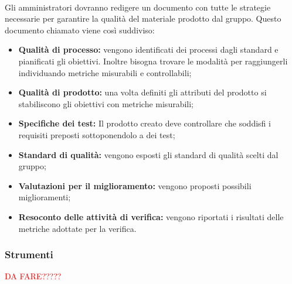 \paragraph{\PdQ} Gli amministratori dovranno redigere un documento con tutte le strategie necessarie per garantire la qualità del materiale prodotto dal gruppo. Questo documento chiamato \PdQv{} viene così suddiviso:
\begin{itemize}
    \item \textbf{Qualità di processo:} vengono identificati dei processi dagli standard e pianificati gli obiettivi. Inoltre bisogna trovare le modalità per raggiungerli individuando metriche misurabili e controllabili;
    
    \item \textbf{Qualità di prodotto:} una volta definiti gli attributi del prodotto si stabiliscono gli obiettivi con metriche misurabili;
    
    \item \textbf{Specifiche dei test:} Il prodotto creato deve controllare che soddisfi i requisiti preposti sottoponendolo a dei test;
    
    \item \textbf{Standard di qualità:} vengono esposti gli standard di qualità scelti dal gruppo;
    
    \item \textbf{Valutazioni per il miglioramento:} vengono proposti possibili miglioramenti;
    
    \item \textbf{Resoconto delle attività di verifica:} vengono riportati i risultati delle metriche adottate per la verifica.
\end{itemize}

\subsubsection{Strumenti}
\textcolor{red}{DA FARE?????}
